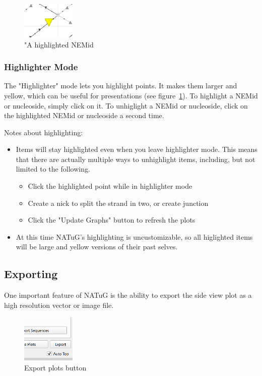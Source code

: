 \documentclass[titlepage]{article}
\begin{document}
\begin{figure}
	\centering
	\includegraphics[width=1in]{highlighted-nemid.png}
	\caption{"A highlighted NEMid}
	\label{fig:highlighted-NEMid}
\end{figure}

\subsubsection{Highlighter Mode}

The "Highlighter" mode lets you highlight points. It makes them larger and yellow, which can be useful for presentations (see figure~\ref{fig:highlighted-NEMid}). 
To highlight a NEMid or nucleoside, simply click on it. To unhiglight a NEMid or nucleoside, click on the highlighted NEMid or nucleoside a second time.

Notes about highlighting:
\begin{itemize}
	\item Items will stay highlighted even when you leave highlighter mode. This means that there are actually multiple ways to unhighlight items, including, but not limited to the following.
	\begin{itemize}
		\item Click the highlighted point while in highlighter mode
		\item Create a nick to split the strand in two, or create junction
		\item Click the "Update Graphs" button to refresh the plots
	\end{itemize}
	\item At this time NATuG's highlighting is uncustomizable, so all higlighted items will be large and yellow versions of their past selves.
\end{itemize}

\subsection{Exporting}

One important feature of NATuG is the ability to export the side view plot as a high resolution vector or image file.

\begin{figure}[h] \label{export-plots-button}
	\centering
	\caption{Export plots button}
	\includegraphics[width=1in]{export-plots-button.png}
\end{figure}
\end{document}

